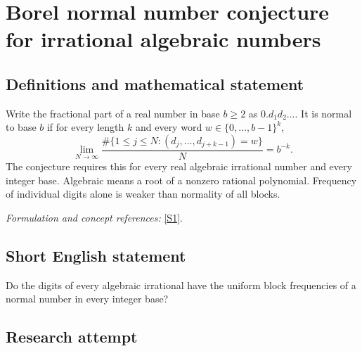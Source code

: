 \documentclass[11pt,a4paper]{article}
\newcommand{\sref}[2]{\hyperlink{source:#1:#2}{[S#2]}}
\newif\ifshowcatalogue
\newcommand{\cataloguescope}[1]{\ifshowcatalogue
 \paragraph{Exact scope in the supplied catalogue.}
 \begin{quote}\small #1\end{quote}\fi}
\numberwithin{equation}{section}
\begin{document}
\setcounter{section}{132}
\setlength{\parskip}{3pt plus 1pt}
\clearpage
\section{\texorpdfstring{Borel normal number conjecture for irrational algebraic numbers}{Borel normal number conjecture for irrational algebraic numbers}}\label{133}
\subsection{Definitions and mathematical statement}
Write the fractional part of a real number in base $b\ge2$ as $0.d_1d_2\ldots$. It is normal to base $b$ if for every length $k$ and every word $w\in\{0,\ldots,b-1\}^k$,
\[
 \lim_{N\to\infty}\frac{\#\{1\le j\le N:(d_j,\ldots,d_{j+k-1})=w\}}{N}=b^{-k}.
\]
The conjecture requires this for every real algebraic irrational number and every integer base. Algebraic means a root of a nonzero rational polynomial. Frequency of individual digits alone is weaker than normality of all blocks.
\par\smallskip\textit{Formulation and concept references:} \sref{133}{1}.
\cataloguescope{Prove or disprove that every real irrational algebraic number is normal to every integer base b >= 2.}
\subsection{Short English statement}
Do the digits of every algebraic irrational have the uniform block frequencies of a normal number in every integer base?
\subsection{Research attempt}
\end{document}
